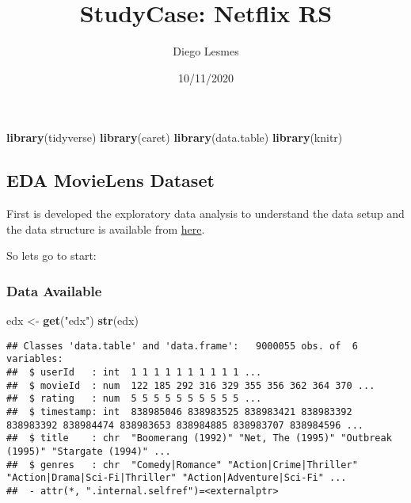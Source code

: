 \documentclass[
]{article}
\title{StudyCase: Netflix RS}
\author{Diego Lesmes}
\date{10/11/2020}
\newenvironment{Shaded}{\begin{snugshade}}{\end{snugshade}}
\newcommand{\KeywordTok}[1]{\textcolor[rgb]{0.13,0.29,0.53}{\textbf{#1}}}
\newcommand{\NormalTok}[1]{#1}
\newcommand{\StringTok}[1]{\textcolor[rgb]{0.31,0.60,0.02}{#1}}
\begin{document}
\maketitle

\begin{Shaded}
\begin{Highlighting}[]
\KeywordTok{library}\NormalTok{(tidyverse)}
\KeywordTok{library}\NormalTok{(caret)}
\KeywordTok{library}\NormalTok{(data.table)}
\KeywordTok{library}\NormalTok{(knitr)}
\end{Highlighting}
\end{Shaded}

\hypertarget{eda-movielens-dataset}{%
\subsection{EDA MovieLens Dataset}\label{eda-movielens-dataset}}

First is developed the exploratory data analysis to understand the data
setup and the data structure is available from
\href{http://files.grouplens.org/datasets/movielens}{here}.

So lets go to start:

\hypertarget{data-available}{%
\subsubsection{Data Available}\label{data-available}}

\begin{Shaded}
\begin{Highlighting}[]
\NormalTok{edx <-}\StringTok{ }\KeywordTok{get}\NormalTok{(}\StringTok{"edx"}\NormalTok{)}
\KeywordTok{str}\NormalTok{(edx)}
\end{Highlighting}
\end{Shaded}

\begin{verbatim}
## Classes 'data.table' and 'data.frame':   9000055 obs. of  6 variables:
##  $ userId   : int  1 1 1 1 1 1 1 1 1 1 ...
##  $ movieId  : num  122 185 292 316 329 355 356 362 364 370 ...
##  $ rating   : num  5 5 5 5 5 5 5 5 5 5 ...
##  $ timestamp: int  838985046 838983525 838983421 838983392 838983392 838984474 838983653 838984885 838983707 838984596 ...
##  $ title    : chr  "Boomerang (1992)" "Net, The (1995)" "Outbreak (1995)" "Stargate (1994)" ...
##  $ genres   : chr  "Comedy|Romance" "Action|Crime|Thriller" "Action|Drama|Sci-Fi|Thriller" "Action|Adventure|Sci-Fi" ...
##  - attr(*, ".internal.selfref")=<externalptr>
\end{verbatim}
\end{document}
